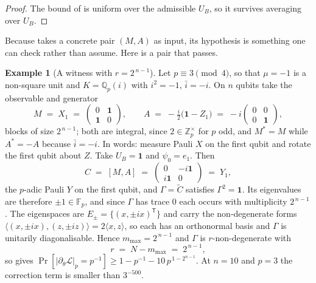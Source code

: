 \documentclass{ceurart}
\theoremstyle{plain}
\theoremstyle{definition}
\newtheorem{example}[theorem]{Example}
\theoremstyle{remark}
\theoremstyle{plain}
\newcommand{\Qp}{\mathbb{Q}_p}
\newcommand{\Zp}{\mathbb{Z}_p}
\newcommand{\padicnorm}[1]{\left|#1\right|_p}
\newcommand{\inner}[2]{\langle #1, #2\rangle}
\newcommand{\Id}{\mathbf{1}}
\newcommand{\loss}{\mathcal{L}}
\newcommand{\FF}{\mathbb{F}}
\begin{document}
\begin{proof}
The bound of  is uniform over the admissible $U_B$, so it
survives averaging over $U_B$.
\end{proof}

Because  takes a concrete pair $(M,A)$ as input, its hypothesis
is something one can check rather than assume. Here is a pair that passes.

\begin{example}[A witness with $r=2^{\,n-1}$]
\label{ex:witness}
Let $p\equiv3\pmod4$, so that $\mu=-1$ is a non-square unit and
$K=\Qp(i)$ with $i^2=-1$, $\bar i=-i$. On $n$ qubits take the observable and
generator
\[
  M\;=\;X_1\;=\;\begin{pmatrix}0&\Id\\ \Id&0\end{pmatrix},
  \qquad
  A\;=\;-\tfrac{i}{2}\bigl(\Id-Z_1\bigr)
  \;=\;-i\begin{pmatrix}0&0\\ 0&\Id\end{pmatrix},
\]
blocks of size $2^{\,n-1}$; both are integral, since $2\in\Zp^\times$ for $p$
odd, and $M^\ast=M$ while $A^\ast=-A$ because $\bar i=-i$. In words: measure
Pauli $X$ on the first qubit and rotate the first qubit about $Z$. Take
$U_B=\Id$ and $\psi_0=e_1$. Then
\[
  C\;=\;[M,A]\;=\;\begin{pmatrix}0&-i\Id\\ i\Id&0\end{pmatrix}\;=\;Y_1 ,
\]
the $p$-adic Pauli $Y$ on the first qubit, and $\Gamma=\widetilde C$ satisfies
$\Gamma^2=\Id$. Its eigenvalues are therefore $\pm1\in\FF_p$, and since
$\Gamma$ has trace $0$ each occurs with multiplicity $2^{\,n-1}$. The
eigenspaces are $E_{\pm}=\{(x,\pm ix)^{\mathsf T}\}$ and carry the
non-degenerate forms $\inner{(x,\pm ix)}{(z,\pm iz)}=2\inner xz$, so each has
an orthonormal basis and $\Gamma$ is unitarily diagonalisable. Hence
$m_{\max}=2^{\,n-1}$ and $\Gamma$ is $r$-non-degenerate with
\[
  r\;=\;N-m_{\max}\;=\;2^{\,n-1},
\]
so  gives $\Pr[\padicnorm{\partial_\theta\loss}=p^{-1}]\ge
1-p^{-1}-10\,p^{\,1-2^{n-1}}$. At $n=10$ and $p=3$ the correction term is
smaller than $3^{-500}$.
\end{example}
\end{document}
